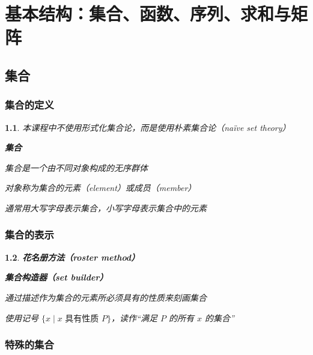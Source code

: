 \documentclass[UTF8]{report}
\theoremstyle{MyLineTheoremStyle} %
\theoremstyle{MyBlockTheoremStyle} %
\theoremstyle{MySubsubsectionStyle} %
\newtheorem{definition}{}
\begin{document}
\chapter{基本结构：集合、函数、序列、求和与矩阵}\thispagestyle{fancy} 

\section{集合}

\subsection{集合的定义}

\begin{definition}
    本课程中不使用形式化集合论，而是使用朴素集合论（naïve set theory）\par
    \textbf{集合}\par
    集合是一个由不同对象构成的无序群体\par
    对象称为集合的元素（element）或成员（member）\par
    通常用大写字母表示集合，小写字母表示集合中的元素\par
\end{definition}

\subsection{集合的表示}

\begin{definition}
    \textbf{花名册方法（roster method）}\par

    \textbf{集合构造器（set builder）}\par
    通过描述作为集合的元素所必须具有的性质来刻画集合\par
    使用记号 $ \{ x \mid x \text{ 具有性质 } P \} $，读作“满足 $P$ 的所有 $x$ 的集合”\par
\end{definition}

\subsection{特殊的集合}
\end{document}
